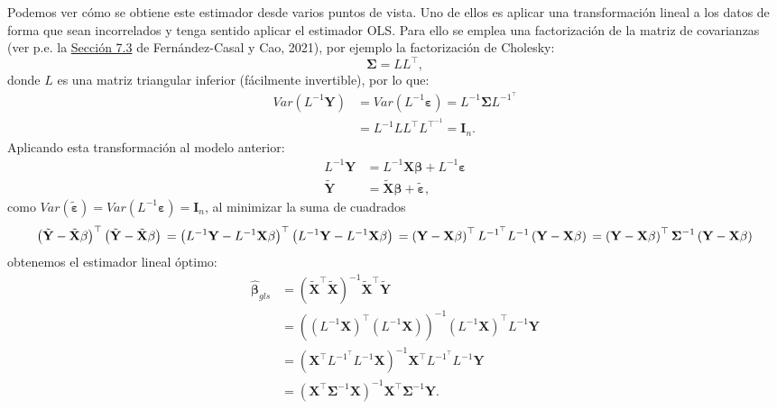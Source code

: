 \documentclass[
]{book}
\theoremstyle{break}
\theoremstyle{definition}
\theoremstyle{definition}
\theoremstyle{definition}
\theoremstyle{definition}
\theoremstyle{remark}
\begin{document}
Podemos ver cómo se obtiene este estimador desde varios puntos de vista.
Uno de ellos es aplicar una transformación lineal a los datos de forma que sean incorrelados y tenga sentido aplicar el estimador OLS.
Para ello se emplea una factorización de la matriz de covarianzas (ver p.e. la \href{https://rubenfcasal.github.io/simbook/fact-cov.html}{Sección 7.3} de Fernández-Casal y Cao, 2021), por ejemplo la factorización de Cholesky:
\[\boldsymbol{\Sigma} = L L^\top,\]
donde \(L\) es una matriz triangular inferior (fácilmente invertible), por lo que:
\[\begin{aligned}
Var\left( L^{-1}\mathbf{Y} \right) & =Var\left( L^{-1}\boldsymbol{\varepsilon} \right) = L^{-1} \boldsymbol{\Sigma} L^{{-1}^\top} \\
&= L^{-1} LL^\top L^{\top^{-1}} = \mathbf{I}_{n}.
\end{aligned}\]
Aplicando esta transformación al modelo anterior:
\[\begin{aligned}
L^{-1}\mathbf{Y} &= L^{-1}\mathbf{X}\boldsymbol{\beta} + L^{-1}\boldsymbol{\varepsilon}\\
\tilde{\mathbf{Y}} &= \tilde{\mathbf{X}}\boldsymbol{\beta} + \tilde{\boldsymbol{\varepsilon}},
\end{aligned}\]
como \(Var(\tilde{\boldsymbol{\varepsilon}}) = Var\left( L^{-1}\boldsymbol{\varepsilon} \right) = \mathbf{I}_{n}\), al minimizar la suma de cuadrados
\[\left( \tilde{\mathbf{Y}}-\tilde{\mathbf{X}}\mathbf{\beta }\right)^{\top }\left( \tilde{\mathbf{Y}}-\tilde{\mathbf{X}}\mathbf{\beta }\right) \\ 
= \left( L^{-1}\mathbf{Y}-L^{-1}\mathbf{X}\mathbf{\beta }\right)^{\top }\left( L^{-1}\mathbf{Y}-L^{-1}\mathbf{X}\mathbf{\beta }\right) \\
= \left( \mathbf{Y}-\mathbf{X}\mathbf{\beta }\right)^{\top } L^{{-1}^\top}L^{-1}  \left( \mathbf{Y}-\mathbf{X}\mathbf{\beta }\right) \\
= \left( \mathbf{Y}-\mathbf{X}\mathbf{\beta }\right)^{\top } \boldsymbol{\Sigma}^{-1}\left( \mathbf{Y}-\mathbf{X}\mathbf{\beta }\right)\]
obtenemos el estimador lineal óptimo:
\[\begin{aligned}
\hat{\boldsymbol{\beta}}_{gls} &=(\tilde{\mathbf{X}}^{\top}\tilde{\mathbf{X}})^{-1}\tilde{\mathbf{X}}^{\top}\tilde{\mathbf{Y}} \\
&=\left(\left( L^{-1}\mathbf{X}\right)^{\top}\left( L^{-1}\mathbf{X}\right)\right)^{-1}\left( L^{-1}\mathbf{X}\right)^{\top}L^{-1}\mathbf{Y} \\
&= \left(\mathbf{X}^{\top}L^{{-1}^\top}L^{-1} \mathbf{X}\right)^{-1} \mathbf{X}^{\top}L^{{-1}^\top}L^{-1} \mathbf{Y} \\
&= (\mathbf{X}^{\top}\boldsymbol{\Sigma}^{-1} \mathbf{X})^{-1} \mathbf{X}^{\top}\boldsymbol{\Sigma}^{-1} \mathbf{Y}.
\end{aligned}\]
\end{document}
